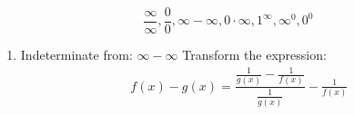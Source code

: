     \begin{equation}
        \dfrac{\infty}{\infty}, \dfrac{0}{0}, \infty - \infty, 0 \cdot \infty,
        1^{\infty}, \infty^{0}, 0^{0}
    \end{equation}

    \begin{enumerate}
        \item Indeterminate from: $\infty - \infty$
            Transform the expression: \\
            \begin{align*}
                f(x) - g(x) = \dfrac{\frac{1}{g(x)} - \frac{1}{f(x)}}{\frac{1}{g(x)}} - \frac{1}{f(x)}
            \end{align*}
    \end{enumerate}

